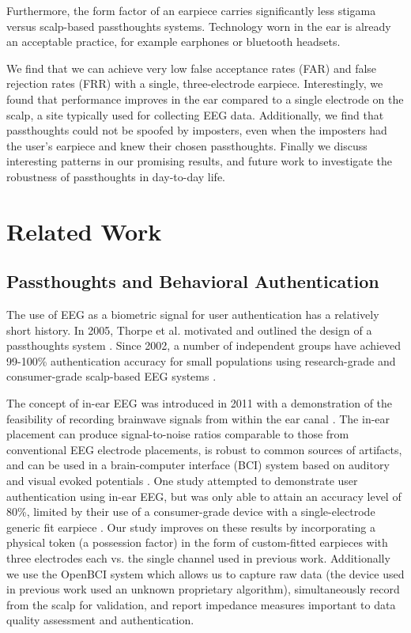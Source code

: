 \documentclass{sigchi}
\begin{document}
Furthermore, the form factor of an earpiece carries significantly less stigama versus scalp-based passthoughts systems. Technology worn in the ear is already an acceptable practice, for example earphones or bluetooth headsets.

We find that we can achieve very low false acceptance rates (FAR) and false rejection rates (FRR) with a single, 
three-electrode earpiece. Interestingly, we found that performance improves in the ear compared to a single electrode on the scalp, a site typically used for collecting EEG data. Additionally, we find that passthoughts could not be spoofed by imposters, even when the imposters had the user's earpiece and knew their chosen passthoughts. Finally we discuss interesting patterns in our promising results, and future work to investigate the robustness of passthoughts in day-to-day life.

\section{Related Work}

\subsection{Passthoughts and Behavioral Authentication}
The use of EEG as a biometric signal for user authentication has a relatively short history.
In 2005, Thorpe et al. motivated and outlined the design of a passthoughts system \cite{Thorpe2005}.
Since 2002, a number of independent groups have achieved 99-100\% authentication accuracy for small populations using research-grade and consumer-grade scalp-based EEG systems \cite{Poulos2002,Marcel2007a,Ashby2011,Chuang2013b}.

The concept of in-ear EEG was introduced in 2011 with a demonstration of the feasibility of recording brainwave signals from within the ear canal \cite{Looney2011}. The in-ear placement can produce signal-to-noise ratios comparable to those from conventional EEG electrode placements, is robust to common sources of artifacts, and can be used in a brain-computer interface (BCI) system based on auditory and visual evoked potentials \cite{Kidmose2013a}. One study attempted to demonstrate user authentication using in-ear EEG, but was only able to attain an accuracy level of 80\%, limited by their use of a consumer-grade device with a single-electrode generic fit earpiece \cite{curran2016passthoughts}. Our study improves on these results by incorporating a physical token (a possession factor) in the form of custom-fitted earpieces with three electrodes each vs. the single channel used in previous work. Additionally we use the OpenBCI system which allows us to capture raw data (the device used in previous work used an unknown proprietary algorithm), simultaneously record from the scalp for validation, and report impedance measures important to data quality assessment and authentication.
\end{document}
